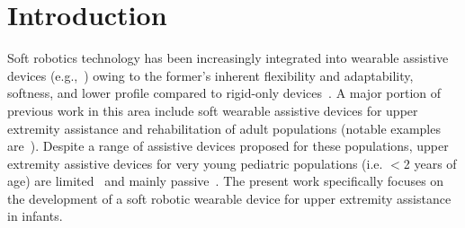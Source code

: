 \documentclass[letterpaper, 10pt, conference]{ieeeconf}      %
\newcommand{\changed}[1]{{\color{red}{#1}}}
\def\kkb{\textcolor{blue}}
\def\kkr{\textcolor{red}}
\begin{document}







\section{Introduction}

Soft robotics technology has been increasingly integrated into wearable assistive devices (e.g.,~\cite{yumbla2021human}) owing to the former's inherent flexibility and adaptability, softness, and lower profile compared to rigid-only devices~\cite{o2017soft}. 
A major portion of previous work in this area include soft wearable assistive devices for upper extremity assistance and rehabilitation of adult populations (notable examples are~\cite{proietti2021sensing, o2020inflatable, park2017development}).
Despite a range of assistive devices proposed for these populations, upper extremity assistive devices for very young pediatric populations (i.e. $<$2 years of age) are limited~\cite{arnold2020exploring, christy2016technology} and mainly passive~\cite{lobo2016playskin, babik2016feasibility}.
The present work specifically focuses on the development of a soft robotic wearable device for upper extremity assistance in infants.

\end{document}

